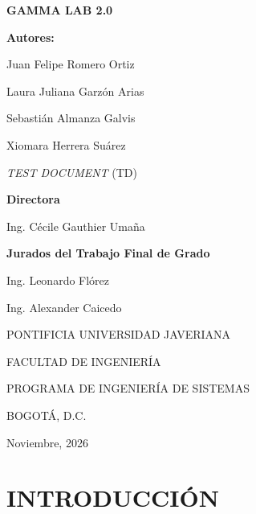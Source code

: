 \documentclass[12pt,letterpaper,oneside]{article}
\DeclareRobustCommand{\_}{\textunderscore\allowbreak}
\newcommand{\tituloProyecto}{GAMMA LAB 2.0}
\newcommand{\autorUno}{Juan Felipe Romero Ortiz}
\newcommand{\autorDos}{Laura Juliana Garzón Arias}
\newcommand{\autorTres}{Sebastián Almanza Galvis}
\newcommand{\autorCuatro}{Xiomara Herrera Suárez}
\newcommand{\nombreDocumento}{\textit{TEST DOCUMENT} (TD)}
\newcommand{\director}{Ing. Cécile Gauthier Umaña}
\newcommand{\juradoUno}{Ing. Leonardo Flórez}
\newcommand{\juradoDos}{Ing. Alexander Caicedo}
\newcommand{\universidad}{PONTIFICIA UNIVERSIDAD JAVERIANA}
\newcommand{\facultad}{FACULTAD DE INGENIERÍA}
\newcommand{\programa}{PROGRAMA DE INGENIERÍA DE SISTEMAS}
\newcommand{\ciudad}{BOGOTÁ, D.C.}
\newcommand{\fechaLarga}{Noviembre, 2026}
\begin{document}

\begin{center}
  {\Large\bfseries \tituloProyecto}\par
  \vspace{1.4cm}

  {\bfseries Autores:}\par
  \vspace{0.5cm}
  \autorUno\par
  \autorDos\par
  \autorTres\par
  \autorCuatro\par
  \vspace{1.4cm}

  \nombreDocumento\par
  \vspace{1.4cm}

  {\bfseries Directora}\par
  \vspace{0.4cm}
  \director\par
  \vspace{1.2cm}

  {\bfseries Jurados del Trabajo Final de Grado}\par
  \vspace{0.4cm}
  \juradoUno\par
  \juradoDos\par
  \vspace{1.8cm}

  \universidad\par\vspace{0.6cm}
  \facultad\par\vspace{0.6cm}
  \programa\par\vspace{0.6cm}
  \ciudad\par\vspace{0.6cm}
  \fechaLarga\par
\end{center}
\clearpage

\tableofcontents
\clearpage
\listoftables

\clearpage
{}

\section{INTRODUCCIÓN}
\end{document}
